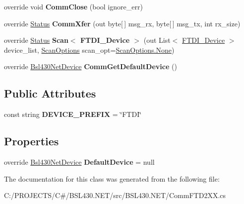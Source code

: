 \begin{DoxyCompactItemize}
override void {\bfseries Comm\+Close} (bool ignore\+\_\+err)
\item 
\mbox{\label{class_b_s_l430___n_e_t_1_1_comm_1_1_comm_f_t_d2_x_x_a05f267ea4971c6d24682473d94a7712d}} 
override \mbox{\hyperlink{class_b_s_l430___n_e_t_1_1_status}{Status}} {\bfseries Comm\+Xfer} (out byte\mbox{[}$\,$\mbox{]} msg\+\_\+rx, byte\mbox{[}$\,$\mbox{]} msg\+\_\+tx, int rx\+\_\+size)
\item 
\mbox{\label{class_b_s_l430___n_e_t_1_1_comm_1_1_comm_f_t_d2_x_x_a74c4552963c21f74829d04cde672e182}} 
override \mbox{\hyperlink{class_b_s_l430___n_e_t_1_1_status}{Status}} {\bfseries Scan$<$ F\+T\+D\+I\+\_\+\+Device $>$} (out List$<$ \mbox{\hyperlink{class_b_s_l430___n_e_t_1_1_comm_1_1_f_t_d_i___device}{F\+T\+D\+I\+\_\+\+Device}} $>$ device\+\_\+list, \mbox{\hyperlink{namespace_b_s_l430___n_e_t_a4cd6f8166a2a97ccb3405df2287d4ba8}{Scan\+Options}} scan\+\_\+opt=\mbox{\hyperlink{namespace_b_s_l430___n_e_t_a4cd6f8166a2a97ccb3405df2287d4ba8a6adf97f83acf6453d4a6a4b1070f3754}{Scan\+Options.\+None}})
\item 
\mbox{\label{class_b_s_l430___n_e_t_1_1_comm_1_1_comm_f_t_d2_x_x_a7ac2eb8408c4c6a2c3e377d728b44ec0}} 
override \mbox{\hyperlink{class_b_s_l430___n_e_t_1_1_bsl430_net_device}{Bsl430\+Net\+Device}} {\bfseries Comm\+Get\+Default\+Device} ()
\end{DoxyCompactItemize}
\subsection*{Public Attributes}
\begin{DoxyCompactItemize}
\item 
\mbox{\label{class_b_s_l430___n_e_t_1_1_comm_1_1_comm_f_t_d2_x_x_a5a6744364e1e7fbac8be10d58f1dfc11}} 
const string {\bfseries D\+E\+V\+I\+C\+E\+\_\+\+P\+R\+E\+F\+IX} = \char`\"{}F\+T\+DI\char`\"{}
\end{DoxyCompactItemize}
\subsection*{Properties}
\begin{DoxyCompactItemize}
\item 
\mbox{\label{class_b_s_l430___n_e_t_1_1_comm_1_1_comm_f_t_d2_x_x_a6c562757dec7f3d814d8f98183ca6221}} 
override \mbox{\hyperlink{class_b_s_l430___n_e_t_1_1_bsl430_net_device}{Bsl430\+Net\+Device}} {\bfseries Default\+Device} = null
\end{DoxyCompactItemize}


The documentation for this class was generated from the following file\+:\begin{DoxyCompactItemize}
\item 
C\+:/\+P\+R\+O\+J\+E\+C\+T\+S/\+C\#/\+B\+S\+L430.\+N\+E\+T/src/\+B\+S\+L430.\+N\+E\+T/Comm\+F\+T\+D2\+X\+X.\+cs\end{DoxyCompactItemize}

